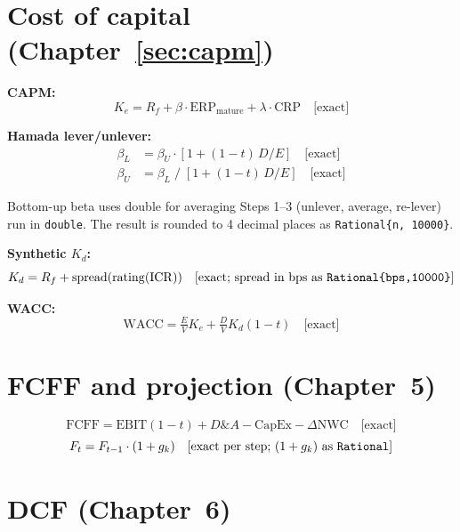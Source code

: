 \documentclass[12pt, a4paper, oneside]{book}
\newcommand{\EBIT}{\ensuremath{\mathrm{EBIT}}}
\newcommand{\FCFF}{\ensuremath{\mathrm{FCFF}}}
\newcommand{\WACC}{\ensuremath{\mathrm{WACC}}}
\newcommand{\ERP}{\ensuremath{\mathrm{ERP}}}
\newcommand{\CRP}{\ensuremath{\mathrm{CRP}}}
\newcommand{\Ke}{K_e}
\newcommand{\Kd}{K_d}
\newcommand{\Rf}{R_f}
\newcommand{\DA}{D\&A}
\newcommand{\NWC}{\mathrm{NWC}}
\begin{document}
\section{Cost of capital (Chapter~\ref{sec:capm})}

\textbf{CAPM:}
\begin{equation}
  \Ke = \Rf + \beta\cdot\ERP_{\mathrm{mature}} + \lambda\cdot\CRP
  \quad\text{[exact]}
\end{equation}

\textbf{Hamada lever/unlever:}
\begin{align}
  \beta_L &= \beta_U\cdot[1+(1-t)\,D/E] \quad\text{[exact]}\\
  \beta_U &= \beta_L\;/\;[1+(1-t)\,D/E] \quad\text{[exact]}
\end{align}

\begin{impl}{Bottom-up beta uses double for averaging}
Steps 1--3 (unlever, average, re-lever) run in \texttt{double}.
The result is rounded to 4 decimal places as \texttt{Rational\{n, 10000\}}.
\end{impl}

\textbf{Synthetic $\Kd$:}
\begin{equation}
  \Kd = \Rf + \mathrm{spread}(\mathrm{rating}(\mathrm{ICR}))
  \quad\text{[exact;\ spread in bps as \texttt{Rational\{bps,10000\}}]}
\end{equation}

\textbf{WACC:}
\begin{equation}
  \WACC = \tfrac{E}{V}\Ke + \tfrac{D}{V}\Kd(1-t) \quad\text{[exact]}
\end{equation}

\section{FCFF and projection (Chapter~5)}

\begin{equation}
  \FCFF = \EBIT(1-t) + \DA - \mathrm{CapEx} - \Delta\NWC \quad\text{[exact]}
\end{equation}
\begin{equation}
  F_t = F_{t-1}\cdot(1+g_k) \quad\text{[exact per step; }(1+g_k)
        \text{ as \texttt{Rational}]}
\end{equation}

\section{DCF (Chapter~6)}
\end{document}
